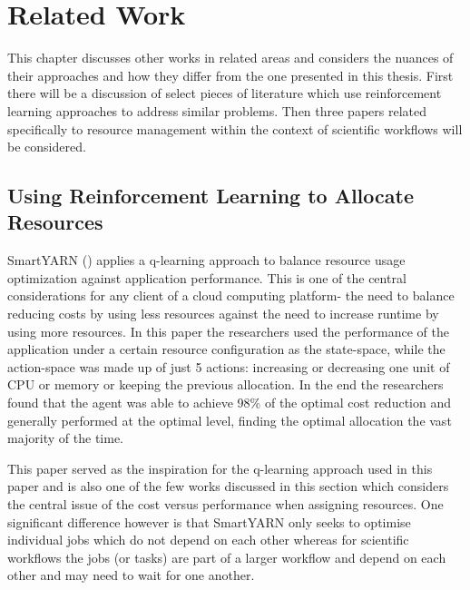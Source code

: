
\cleardoublepage
\chapter{Related Work}
\label{cha:related_work}

This chapter discusses other works in related areas and considers the nuances of their approaches and how they differ from the one presented in this thesis. First there will be a discussion of select pieces of literature which use reinforcement learning approaches to address similar problems. Then three papers related specifically to resource management within the context of scientific workflows will be considered.


\section{Using Reinforcement Learning to Allocate Resources}
 \label{sec:rl_allocation}
 
SmartYARN (\cite{smartYarn}) applies a q-learning approach to balance resource usage optimization against application performance. This is one of the central considerations for any client of a cloud computing platform- the need to balance reducing costs by using less resources against the need to increase runtime by using more resources. In this paper the researchers used the performance of the application under a certain resource configuration as the state-space, while the action-space was made up of just 5 actions: increasing or decreasing one unit of CPU or memory or keeping the previous allocation. In the end the researchers found that the agent was able to achieve 98\% of the optimal cost reduction and generally performed at the optimal level, finding the optimal allocation the vast majority of the time.

This paper served as the inspiration for the q-learning approach used in this paper and is also one of the few works discussed in this section which considers the central issue of the cost versus performance when assigning resources. One significant difference however is that SmartYARN only seeks to optimise individual jobs which do not depend on each other whereas for scientific workflows the jobs (or tasks) are part of a larger workflow and depend on each other and may need to wait for one another.

